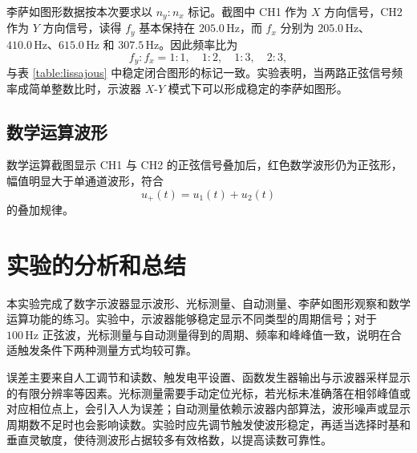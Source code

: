 \documentclass{../template/myrpt}
\begin{document}
李萨如图形数据按本次要求以 $n_y:n_x$ 标记。截图中 CH1 作为 $X$ 方向信号，CH2 作为 $Y$ 方向信号，读得 $f_y$ 基本保持在 $205.0\,\si{\hertz}$，而 $f_x$ 分别为 $205.0\,\si{\hertz}$、$410.0\,\si{\hertz}$、$615.0\,\si{\hertz}$ 和 $307.5\,\si{\hertz}$。因此频率比为
\[
  f_y:f_x = 1:1,\quad 1:2,\quad 1:3,\quad 2:3,
\]
与表 \ref{table:lissajous} 中稳定闭合图形的标记一致。实验表明，当两路正弦信号频率成简单整数比时，示波器 $X$-$Y$ 模式下可以形成稳定的李萨如图形。

\subsection{数学运算波形}

数学运算截图显示 CH1 与 CH2 的正弦信号叠加后，红色数学波形仍为正弦形，幅值明显大于单通道波形，符合
\[
  u_+(t)=u_1(t)+u_2(t)
\]
的叠加规律。

\section{实验的分析和总结}

本实验完成了数字示波器显示波形、光标测量、自动测量、李萨如图形观察和数学运算功能的练习。实验中，示波器能够稳定显示不同类型的周期信号；对于 $100\,\si{\hertz}$ 正弦波，光标测量与自动测量得到的周期、频率和峰峰值一致，说明在合适触发条件下两种测量方式均较可靠。

误差主要来自人工调节和读数、触发电平设置、函数发生器输出与示波器采样显示的有限分辨率等因素。光标测量需要手动定位光标，若光标未准确落在相邻峰值或对应相位点上，会引入人为误差；自动测量依赖示波器内部算法，波形噪声或显示周期数不足时也会影响读数。实验时应先调节触发使波形稳定，再适当选择时基和垂直灵敏度，使待测波形占据较多有效格数，以提高读数可靠性。

\insertSignedDataPage
\end{document}
